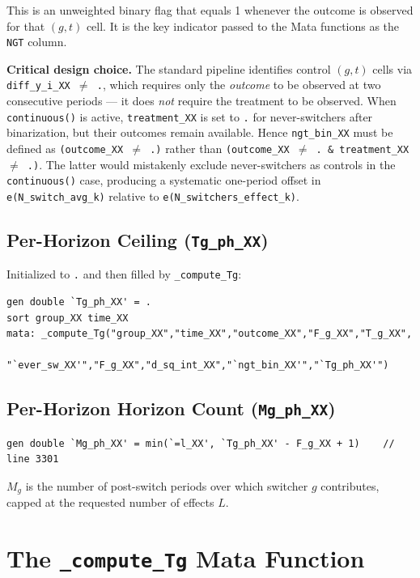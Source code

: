 \documentclass[11pt]{article}
\begin{document}
This is an unweighted binary flag that equals 1 whenever the outcome is
observed for that $(g,t)$ cell. It is the key indicator passed to the Mata
functions as the \texttt{NGT} column.

\textbf{Critical design choice.} The standard pipeline identifies control
$(g,t)$ cells via \texttt{diff\_y\_i\_XX $\neq$ .}, which requires only the
\emph{outcome} to be observed at two consecutive periods --- it does
\emph{not} require the treatment to be observed. When \texttt{continuous()} is
active, \texttt{treatment\_XX} is set to \texttt{.} for never-switchers after
binarization, but their outcomes remain available. Hence
\texttt{ngt\_bin\_XX} must be defined as \texttt{(outcome\_XX $\neq$ .)}
rather than \texttt{(outcome\_XX $\neq$ .\ \&\ treatment\_XX $\neq$ .)}.
The latter would mistakenly exclude never-switchers as controls in the
\texttt{continuous()} case, producing a systematic one-period offset in
\texttt{e(N\_switch\_avg\_k)} relative to \texttt{e(N\_switchers\_effect\_k)}.

\subsection{Per-Horizon Ceiling (\texttt{Tg\_ph\_XX})}

Initialized to \texttt{.} and then filled by \texttt{\_compute\_Tg}:

\begin{lstlisting}[language={}]
gen double `Tg_ph_XX' = .
sort group_XX time_XX
mata: _compute_Tg("group_XX","time_XX","outcome_XX","F_g_XX","T_g_XX",
      "`ever_sw_XX'","F_g_XX","d_sq_int_XX","`ngt_bin_XX'","`Tg_ph_XX'")
\end{lstlisting}

\subsection{Per-Horizon Horizon Count (\texttt{Mg\_ph\_XX})}

\begin{lstlisting}[language={}]
gen double `Mg_ph_XX' = min(`=l_XX', `Tg_ph_XX' - F_g_XX + 1)    // line 3301
\end{lstlisting}

$M_g$ is the number of post-switch periods over which switcher $g$ contributes,
capped at the requested number of effects $L$.

\section{The \texttt{\_compute\_Tg} Mata Function}
\end{document}
